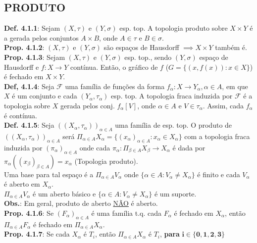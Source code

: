 \documentclass{article}
\begin{document}
\begin{landscape}
\begin{center}
\section{PRODUTO}
\end{center}
\begin{multicols}{3} 
\textbf{Def. 4.1.1}: Sejam $(X,\tau)$ e $(Y, \sigma)$ esp. top. A topologia produto sobre $X \times Y$ é a gerada pelos conjuntos $A \times B$, onde $A\in \tau$ e $B \in \sigma$.\\
\textbf{Prop. 4.1.2}: $(X, \tau)$ e $(Y, \sigma)$ são espaços de Hausdorff $\implies X\times Y$ também é.\\
\textbf{Prop. 4.1.3}: Sejam $(X,\tau)$ e $(Y, \sigma)$ esp. top., sendo $(Y, \sigma)$ espaço de Hausdorff e $f:X\rightarrow Y$ contínua. Então, o gráfico de $f$ ($G = \{(x,f(x)): x \in X\}$) é fechado em $X \times Y$.\\
\textbf{Def, 4.1.4}: Seja $\mathcal{F}$ uma família de funções da forma $f_{\alpha}: X \rightarrow Y_{\alpha},\alpha \in A$, em que $X$ é um conjunto e cada $(Y_\alpha,\tau_\alpha)$ esp. top. A topologia fraca induzida por $\mathcal{F}$ é a topologia sobre $X$ gerada pelos conj. $f_\alpha[V]$, onde $\alpha \in A$ e $V \in \tau_\alpha$. Assim, cada $f_\alpha$ é contínua.\\
\textbf{Def. 4.1.5}: Seja $((X_\alpha, \tau_\alpha))_{\alpha \in A}$ uma família de esp. top. O produto de $((X_\alpha, \tau_\alpha))_{\alpha \in A}$ será $\Pi _{\alpha \in A}X_\alpha = \{(x_\alpha)_{\alpha \in A}:x_\alpha \in X_\alpha\}$ com a topologia fraca induzida por $(\pi_\alpha)_{\alpha \in A}$ onde cada $\pi_\alpha:\Pi_{\beta \in A}X_\beta \rightarrow X_\alpha$ é dada por $\pi_\alpha((x_\beta)_{\beta \in A})=x_\alpha$ (Topologia produto).\\
Uma base para tal espaço é a $\Pi_{\alpha \in A}V_\alpha$ onde $\{\alpha \in A: V_\alpha \neq X_\alpha\}$ é finito e cada $V_\alpha$ é aberto em $X_\alpha$.\\
$\Pi_{\alpha \in A}V_\alpha$ é um aberto básico e $\{\alpha \in A: V_\alpha \neq X_\alpha\}$ é um suporte.\\
\textbf{Obs.}: Em geral, produto de aberto \underline{NÃO} é aberto.\\
\textbf{Prop. 4.1.6}: Se $(F_\alpha)_{\alpha \in A}$ é uma família t.q. cada $F_\alpha$ é fechado em $X_\alpha$, então $\Pi_{\alpha \in A}F_\alpha$ é fechado em $\Pi_{\alpha \in A}X_\alpha$.\\
\textbf{Prop. 4.1.7}: Se cada $X_\alpha$ é $T_i$, então $\Pi_{\alpha \in A} X_\alpha$ é $T_i$, \textbf{para} $\mathbf{i \in \{0,1,2,3\}}$

\end{multicols}
\end{landscape}
\end{document}

